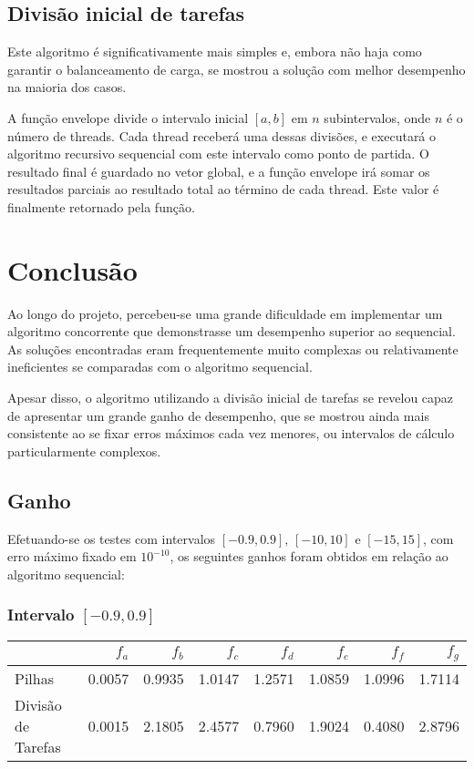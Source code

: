 \documentclass[11pt]{article}
\begin{document}
\subsection{Divisão inicial de tarefas}
\label{sec:org6ec8f67}
Este algoritmo é significativamente mais simples e, embora não haja como garantir o balanceamento
de carga, se mostrou a solução com melhor desempenho na maioria dos casos.

A função envelope divide o intervalo inicial \([a, b]\) em \(n\) subintervalos, onde \(n\)
é o número de threads. Cada thread receberá uma dessas divisões, e executará o algoritmo
recursivo sequencial com este intervalo como ponto de partida. O resultado final é guardado no
vetor global, e a função envelope irá somar os resultados parciais ao resultado total ao término
de cada thread. Este valor é finalmente retornado pela função.

\section{Conclusão}
\label{sec:org8445e7e}
Ao longo do projeto, percebeu-se uma grande dificuldade em implementar um algoritmo concorrente que
demonstrasse um desempenho superior ao sequencial. As soluções encontradas eram frequentemente
muito complexas ou relativamente ineficientes se comparadas com o algoritmo sequencial.

Apesar disso, o algoritmo utilizando a divisão inicial de tarefas se revelou capaz de apresentar
um grande ganho de desempenho, que se mostrou ainda mais consistente ao se fixar erros máximos
cada vez menores, ou intervalos de cálculo particularmente complexos.

\subsection{Ganho}
\label{sec:orgf5e10a3}
Efetuando-se os testes com intervalos \([-0.9, 0.9]\), \([-10, 10]\) e \([-15, 15]\), com erro
máximo fixado em \(10^{-10}\), os seguintes ganhos foram obtidos em relação ao algoritmo sequencial:

\subsubsection{Intervalo \([-0.9, 0.9]\)}
\label{sec:org50698e2}
\begin{center}
\begin{tabular}{lrrrrrrr}
 & \(f_a\) & \(f_b\) & \(f_c\) & \(f_d\) & \(f_e\) & \(f_f\) & \(f_g\)\\
\hline
Pilhas & 0.0057 & 0.9935 & 1.0147 & 1.2571 & 1.0859 & 1.0996 & 1.7114\\
Divisão de Tarefas & 0.0015 & 2.1805 & 2.4577 & 0.7960 & 1.9024 & 0.4080 & 2.8796\\
\end{tabular}
\end{center}
\end{document}
